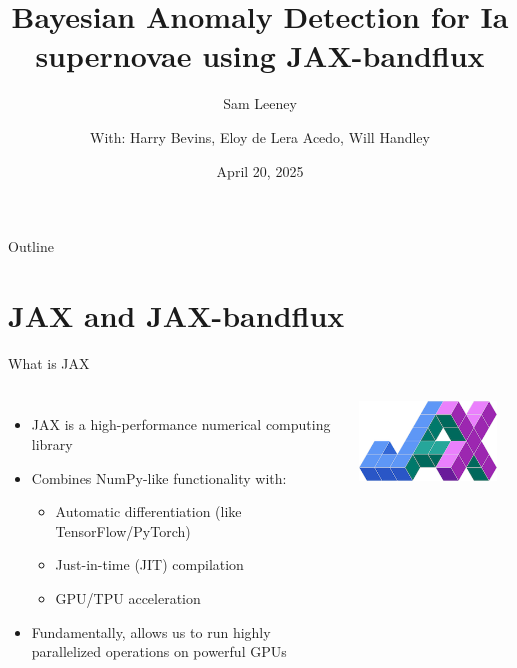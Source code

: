 \documentclass[aspectratio=169]{beamer}
\title{Bayesian Anomaly Detection for Ia supernovae using JAX-bandflux}
\subtitle{Sam Leeney}
\date{April 20, 2025}
\author{With: Harry Bevins, Eloy de Lera Acedo, Will Handley}
\institute{} %
\begin{document}
\begin{frame}
  \titlepage
\end{frame}

\begin{frame}{Outline}
  \tableofcontents[hideallsubsections]
\end{frame}

\section{JAX and JAX-bandflux}

\begin{frame}{What is JAX}
  \begin{columns}
    \begin{itemize}
      \item JAX is a high-performance numerical computing library
      \item Combines NumPy-like functionality with:
        \begin{itemize}
          \item Automatic differentiation (like TensorFlow/PyTorch)
          \item Just-in-time (JIT) compilation
          \item GPU/TPU acceleration
        \end{itemize}
      \item Fundamentally, allows us to run highly parallelized operations on powerful GPUs
    \end{itemize}
    
    \begin{center}
      \includegraphics[width=0.9\textwidth]{images/jax_logo_250px.png}
    \end{center}
  \end{columns}
\end{frame}
\end{document}
